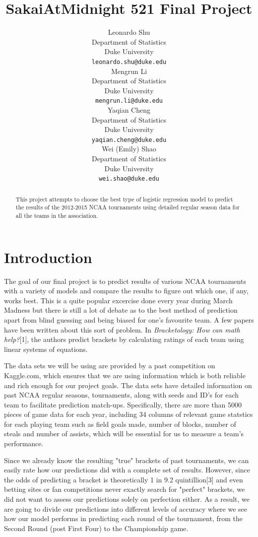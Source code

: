 \documentclass{article} %
\title{SakaiAtMidnight 521 Final Project}
\author{
  Leonardo Shu\\
  Department of Statistics\\
  Duke University\\
  \texttt{leonardo.shu@duke.edu} \\
  \And
  Mengrun Li \\
  Department of Statistics\\
  Duke University\\
  \texttt{mengrun.li@duke.edu} \\
  \AND
  Yaqian Cheng \\
  Department of Statistics\\
  Duke University\\
  \texttt{yaqian.cheng@duke.edu} \\
  \And
  Wei (Emily) Shao \\
  Department of Statistics\\
  Duke University\\
  \texttt{wei.shao@duke.edu} \\
}
\begin{document}
\maketitle

\begin{abstract}
This project attempts to choose the best type of logistic regression model to predict the results of the 2012-2015 NCAA tournaments using detailed regular season data for all the teams in the association.
\end{abstract}

\section{Introduction}

The goal of our final project is to predict results of various NCAA tournaments with a variety of models and compare the results to figure out which one, if any, works best. This is a quite popular excercise done every year during March Madness but there is still a lot of debate as to the best method of prediction apart from blind guessing and being biased for one's favourite team. A few papers have been written about this sort of problem. In \textit{Bracketology: How can math help?}[1], the authors predict brackets by calculating ratings of each team using linear systems of equations.

The data sets we will be using are provided by a past competition on Kaggle.com, which ensures that we are using information which is both reliable and rich enough for our project goals. The data sets have detailed information on past NCAA regular seasons, tournaments, along with seeds and ID's for each team to facilitate prediction match-ups. Specifically, there are more than 5000 pieces of game data for each year, including 34 columns of relevant game statstics for each playing team such as field goals made, number of blocks, number of steals and number of assists, which will be essential for us to measure a team's performance.

Since we already know the resulting "true" brackets of past tournaments, we can easily rate how our predictions did with a complete set of results. However, since the odds of predicting a bracket is theoretically 1 in 9.2 quintillion[3] and even betting sites or fan competitions never exactly search for "perfect" brackets, we did not want to assess our predictions solely on perfection either. As a result, we are going to divide our predictions into different levels of accuracy where we see how our model performs in predicting each round of the tournament, from the Second Round (post First Four) to the Championship game.
\end{document}
